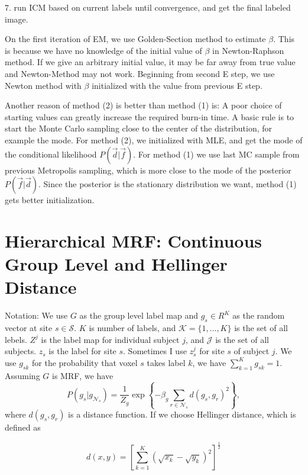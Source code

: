 \documentclass{article}
\begin{document}
\begin{itemize*}
\item [7. ] run ICM based on current labels until convergence, and get
  the final labeled image.
      
\end{itemize*}

On the first iteration of EM, we use Golden-Section method to estimate $\beta$. This is because we have no knowledge of the initial value of $\beta$ in Newton-Raphson method. If we give an arbitrary initial value, it may be far away from true value and Newton-Method may not work. Beginning from second E step, we use Newton method with $\beta$ initialized with the value from previous E step.

Another reason of method (2) is better than method (1) is: A poor choice of starting values can greatly increase the required burn-in time. A basic rule is to start the Monte Carlo sampling close to the center of the distribution, for example the mode. For method (2), we initialized with MLE, and get the mode of the conditional likelihood $P(\vec d | \vec f)$. For method (1) we use last MC sample from previous Metropolis sampling, which is more close to the mode of the posterior $P(\vec f | \vec d)$. Since the posterior is the stationary distribution we want, method (1) gets better initialization. 



\section{Hierarchical MRF: Continuous Group Level and Hellinger Distance}
Notation: We use $G$ as the group level label map and $g_s \in R^K$ as the random vector at site $s \in \mathcal{S}$. $K$ is number of labels, and $\mathcal{K} = \{1, \dots, K\}$ is the set of all lebels.  $Z^j$ is the label map for individual subject $j$, and $\mathcal{J}$ is the set of all subjects. $z_s$ is the label for site $s$. Sometimes I use $z_s^j$ for site $s$ of subject $j$. We use $g_{sk}$ for the probability that voxel $s$ takes label $k$, we have $\sum_{k = 1}^K g_{sk} = 1$. Assuming $G$ is MRF, we have 
\begin{equation*}
  P(g_s | g_{\mathcal{N}_s}) = \frac{1}{Z_g} \exp \left \{ -\beta_g \sum_{r \in \mathcal{N}_s} d(g_s, g_r)^2 \right \},
\end{equation*}
where $d(g_s, g_r)$ is a distance function. If we choose Hellinger distance, which is defined as

\begin{equation*}
  d(x, y) = \left [ \sum_{k = 1}^K (\sqrt{x_k} - \sqrt{y_k} )^2\right ]^{\frac{1}{2}}
\end{equation*}
\end{document}
